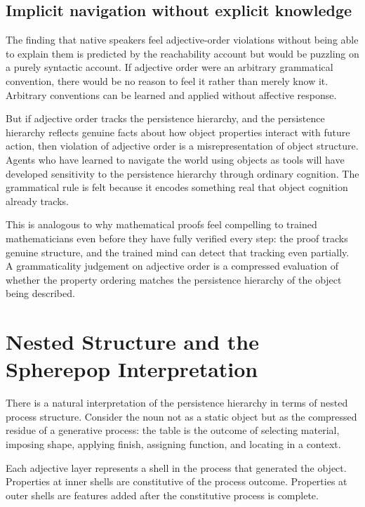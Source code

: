 \documentclass[11pt]{article}
\theoremstyle{rthm}
\theoremstyle{rdef}
\theoremstyle{remark}
\begin{document}
\subsection{Implicit navigation without explicit knowledge}

The finding that native speakers feel adjective-order violations without
being able to explain them is predicted by the reachability account but
would be puzzling on a purely syntactic account. If adjective order were
an arbitrary grammatical convention, there would be no reason to feel it
rather than merely know it. Arbitrary conventions can be learned and applied
without affective response.

But if adjective order tracks the persistence hierarchy, and the persistence
hierarchy reflects genuine facts about how object properties interact with
future action, then violation of adjective order is a misrepresentation
of object structure. Agents who have learned to navigate the world using
objects as tools will have developed sensitivity to the persistence hierarchy
through ordinary cognition. The grammatical rule is felt because it encodes
something real that object cognition already tracks.

This is analogous to why mathematical proofs feel compelling to trained
mathematicians even before they have fully verified every step: the proof
tracks genuine structure, and the trained mind can detect that tracking
even partially. A grammaticality judgement on adjective order is a
compressed evaluation of whether the property ordering matches the
persistence hierarchy of the object being described.

\section{Nested Structure and the Spherepop Interpretation}
\label{sec:spherepop}

There is a natural interpretation of the persistence hierarchy in terms of
nested process structure. Consider the noun not as a static object but as
the compressed residue of a generative process: the table is the outcome
of selecting material, imposing shape, applying finish, assigning function,
and locating in a context.

Each adjective layer represents a shell in the process that generated the
object. Properties at inner shells are constitutive of the process outcome.
Properties at outer shells are features added after the constitutive process
is complete.
\end{document}
